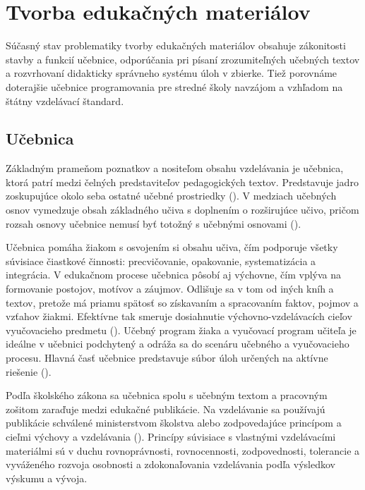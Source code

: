 \chapter{Tvorba edukačných materiálov} 
Súčasný stav problematiky tvorby edukačných materiálov obsahuje zákonitosti stavby a funkcií učebnice, odporúčania pri písaní zrozumiteľných učebných textov a rozvrhovaní didakticky správneho systému úloh v zbierke. Tiež porovnáme doterajšie učebnice programovania pre stredné školy navzájom a vzhľadom na štátny vzdelávací štandard. 

\section{Učebnica}
Základným prameňom poznatkov a nositeľom obsahu vzdelávania je učebnica, ktorá patrí medzi čelných predstaviteľov pedagogických textov. Predstavuje jadro zoskupujúce okolo seba ostatné učebné prostriedky (\cite{zujev_ako_1986}). V medziach učebných osnov vymedzuje obsah základného učiva s doplnením o rozširujúce učivo, pričom rozsah osnovy učebnice nemusí byť totožný s učebnými osnovami (\cite{mlady_tvorba_1988}).

Učebnica pomáha žiakom s osvojením si obsahu učiva, čím podporuje všetky súvisiace čiastkové činnosti: precvičovanie, opakovanie, systematizácia a integrácia. V edukačnom procese učebnica pôsobí aj výchovne, čím vplýva na formovanie postojov, motívov a záujmov. Odlišuje sa v tom od iných kníh a textov, pretože má priamu spätosť so získavaním a spracovaním faktov, pojmov a vzťahov žiakmi. Efektívne tak smeruje dosiahnutie výchovno-vzdelávacích cieľov vyučovacieho predmetu (\cite{gavora_ziak_1992}). Učebný program žiaka a vyučovací program učiteľa je ideálne v učebnici podchytený a odráža sa do scenáru učebného a vyučovacieho procesu. Hlavná časť učebnice predstavuje súbor úloh určených na aktívne riešenie (\cite{pavlovkin_ziak_1989}).

Podľa školského zákona sa učebnica spolu s učebným textom a pracovným zošitom zaraďuje medzi edukačné publikácie. Na vzdelávanie sa používajú publikácie schválené ministerstvom školstva alebo zodpovedajúce princípom a cieľmi výchovy a vzdelávania (\cite{skolsky_zakon}). Princípy súvisiace s vlastnými vzdelávacími materiálmi sú v duchu rovnoprávnosti, rovnocennosti, zodpovednosti, tolerancie a vyváženého rozvoja osobnosti a zdokonaľovania vzdelávania podľa výsledkov výskumu a vývoja.

